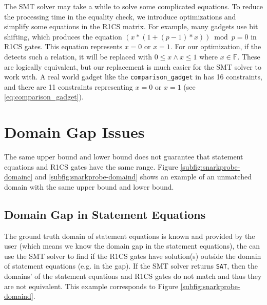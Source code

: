 The SMT solver may take a while to solve some complicated equations. To reduce the processing time in the equality check, we introduce optimizations and simplify some equations in the R1CS matrix. For example, many \libsnark gadgets use bit shifting, which produces the equation $(x * (1 + (p - 1) * x)) \bmod p = 0$ in R1CS gates. This equation represents $x = 0$ or $x = 1$. For our optimization, if the \ConstraintChecker detects such a relation, it will be replaced with $0 \le x \land x \le 1$ where $x \in \mathbb{F}$. These are logically equivalent, but our replacement is much easier for the SMT solver to work with.  A real world gadget like the \texttt{comparison\_gadget} in \libsnark has 16 constraints, and there are 11 constraints representing $x = 0$ or $x = 1$ (see \autoref{eq:comparison_gadget}). %




\section{Domain Gap Issues}
\label{app:snarkprobe-domaingap}
The same upper bound and lower bound does not guarantee that statement equations and R1CS gates have the same range. Figure \ref{subfig:snarkprobe-domainc} and \ref{subfig:snarkprobe-domaind} shows an example of an unmatched domain with the same upper bound and lower bound.

\subsection{Domain Gap in Statement Equations}
The ground truth domain of statement equations is known and provided by the user (which means we know the domain gap in the statement equations), the \ConstraintChecker can use the SMT solver to find if the R1CS gates have solution(s) outside the domain of statement equations (e.g. in the gap). If the SMT solver returns \texttt{SAT}, then the domains' of the statement equations and R1CS gates do not match and thus they are not equivalent.  This example corresponds to Figure \ref{subfig:snarkprobe-domaind}.

